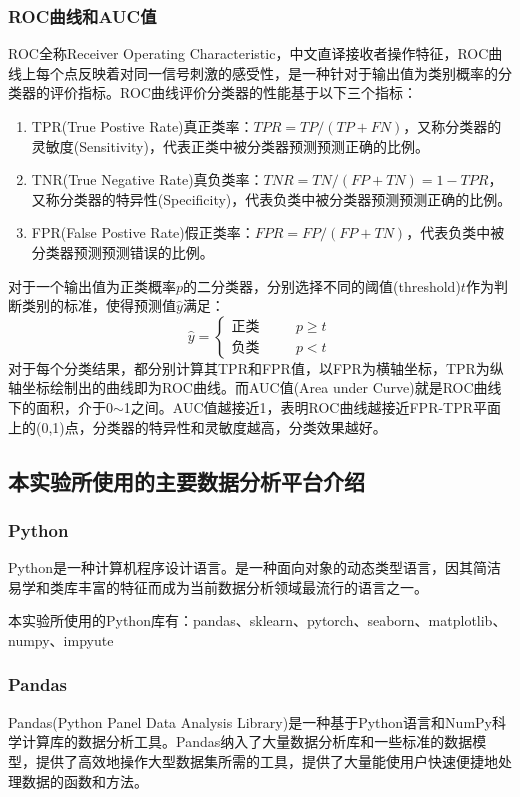 \documentclass[a4paper]{ctexart}
\begin{document}
\subsubsection{ROC曲线和AUC值}
ROC全称Receiver Operating Characteristic，中文直译接收者操作特征，ROC曲线上每个点反映着对同一信号刺激的感受性，是一种针对于输出值为类别概率的分类器的评价指标。ROC曲线评价分类器的性能基于以下三个指标：
\begin{enumerate}
	\item TPR(True Postive Rate)真正类率：$TPR=TP/(TP+FN)$，又称分类器的灵敏度(Sensitivity)，代表正类中被分类器预测预测正确的比例。
	\item TNR(True Negative Rate)真负类率：$TNR=TN/(FP+TN)=1-TPR$，又称分类器的特异性(Specificity)，代表负类中被分类器预测预测正确的比例。
	\item FPR(False Postive Rate)假正类率：$FPR=FP/(FP+TN)$，代表负类中被分类器预测预测错误的比例。
\end{enumerate}
对于一个输出值为正类概率$p$的二分类器，分别选择不同的阈值(threshold)$t$作为判断类别的标准，使得预测值$\hat y$满足：
\begin{equation}
	\hat y=\left\{
	\begin{split}
		\text{正类}&\quad&p\geq t\\
		\text{负类}&\quad&p<t
	\end{split}
	\right.
\end{equation}
对于每个分类结果，都分别计算其TPR和FPR值，以FPR为横轴坐标，TPR为纵轴坐标绘制出的曲线即为ROC曲线。而AUC值(Area under Curve)就是ROC曲线下的面积，介于0$\sim$1之间。AUC值越接近1，表明ROC曲线越接近FPR-TPR平面上的(0,1)点，分类器的特异性和灵敏度越高，分类效果越好。

\subsection{本实验所使用的主要数据分析平台介绍}
\subsubsection{Python}
Python是一种计算机程序设计语言。是一种面向对象的动态类型语言，因其简洁易学和类库丰富的特征而成为当前数据分析领域最流行的语言之一。

本实验所使用的Python库有：pandas、sklearn、pytorch、seaborn、matplotlib、numpy、impyute

\subsubsection{Pandas}
Pandas(Python Panel Data Analysis Library)是一种基于Python语言和NumPy科学计算库的数据分析工具。Pandas纳入了大量数据分析库和一些标准的数据模型，提供了高效地操作大型数据集所需的工具，提供了大量能使用户快速便捷地处理数据的函数和方法。
\end{document}
